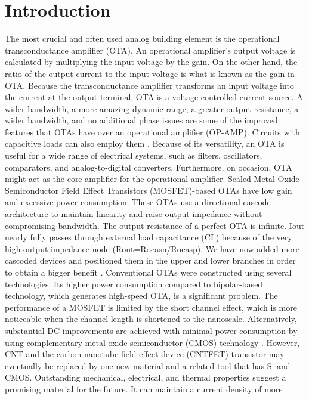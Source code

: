 
\section*{Introduction}

The most crucial and often used analog building element is the operational
transconductance amplifier (OTA). An operational amplifier's output voltage is
calculated by multiplying the input voltage by the gain. On the other hand, the
ratio of the output current to the input voltage is what is known as the gain in
OTA. Because the transconductance amplifier transforms an input voltage into the
current at the output terminal, OTA is a voltage-controlled current source. A
wider bandwidth, a more amazing dynamic range, a greater output resistance, a
wider bandwidth, and no additional phase issues are some of the improved
features that OTAs have over an operational amplifier (OP-AMP). Circuits with
capacitive loads can also employ them \cite{ref1,ref2,ref3}. Because of its
versatility, an OTA is useful for a wide range of electrical systems, such as
filters, oscillators, comparators, and analog-to-digital converters.
Furthermore, on occasion, OTA might act as the core amplifier for the
operational amplifier. Scaled Metal Oxide Semiconductor Field Effect Transistors
(MOSFET)-based OTAs have low gain and excessive power consumption. These OTAs
use a directional cascode architecture to maintain linearity and raise output
impedance without compromising bandwidth. The output resistance of a perfect OTA
is infinite. Iout nearly fully passes through external load capacitance (CL)
because of the very high output impedance node (Rout=Rocasn/Rocasp). We have now
added more cascoded devices and positioned them in the upper and lower branches
in order to obtain a bigger benefit \cite{ref3,ref4,ref5,ref6}.
Conventional OTAs were constructed using several technologies. Its higher power
consumption compared to bipolar-based technology, which generates high-speed
OTA, is a significant problem. The performance of a MOSFET is limited by the
short channel effect, which is more noticeable when the channel length is
shortened to the nanoscale. Alternatively, substantial DC improvements are
achieved with minimal power consumption by using complementary metal oxide
semiconductor (CMOS) technology \cite{ref7,ref8,ref9,ref10}.
However, CNT and the carbon nanotube field-effect device (CNTFET) transistor may
eventually be replaced by one new material and a related tool that has Si and
CMOS. Outstanding mechanical, electrical, and thermal properties suggest a
promising material for the future. It can maintain a current density of more
